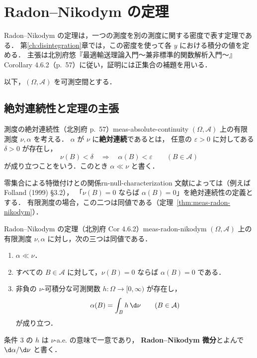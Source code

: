 \chapter{Radon--Nikodym の定理}
\label{ch:radon-nikodym}

Radon--Nikodym の定理は，一つの測度を別の測度に関する密度で表す定理である．
第\ref{ch:disintegration}章では，この密度を使って各 $y$ における積分の値を定める．
主張は北別府悠『最適輸送理論入門〜兼非標準的関数解析入門〜』
Corollary 4.6.2（p.~57）に従い，証明には正集合の補題を用いる．

以下，$(\Omega,\mathcal{A})$ を可測空間とする．

\section{絶対連続性と定理の主張}

\begin{definition}{測度の絶対連続性（北別府 p.~57）}{meas-absolute-continuity}
  $(\Omega,\mathcal{A})$ 上の有限測度 $\nu,\alpha$ を考える．
  $\alpha$ が $\nu$ に\textbf{絶対連続}であるとは，
  任意の $\varepsilon>0$ に対してある $\delta>0$ が存在し，
  \[
    \nu(B)<\delta\quad\Longrightarrow\quad\alpha(B)<\varepsilon
    \qquad(B\in\mathcal{A})
  \]
  が成り立つことをいう．このとき $\alpha\ll\nu$ と書く．
\end{definition}

\begin{remark}{零集合による特徴付けとの関係}{rn-null-characterization}
  文献によっては（例えば Folland (1999) §3.2），
  「$\nu(B)=0$ ならば $\alpha(B)=0$」を絶対連続性の定義とする．
  有限測度の場合，この二つは同値である（定理~\ref{thm:meas-radon-nikodym}）．
\end{remark}

\begin{theorem}{Radon--Nikodym の定理（北別府 Cor 4.6.2）}{meas-radon-nikodym}
  $(\Omega,\mathcal{A})$ 上の有限測度 $\nu,\alpha$ に対し，次の三つは同値である．
  \begin{enumerate}
    \item $\alpha\ll\nu$．
    \item すべての $B\in\mathcal{A}$ に対して，$\nu(B)=0$ ならば $\alpha(B)=0$ である．
    \item 非負の $\nu$-可積分な可測関数 $h\colon\Omega\to[0,\infty)$ が存在し，
      \[
        \alpha(B)=\int_Bh\,\d\nu\qquad(B\in\mathcal{A})
      \]
      が成り立つ．
  \end{enumerate}
  条件 3 の $h$ は $\nu$-a.e. の意味で一意であり，
  \textbf{Radon--Nikodym 微分}とよんで $\d\alpha/\d\nu$ と書く．
\end{theorem}

